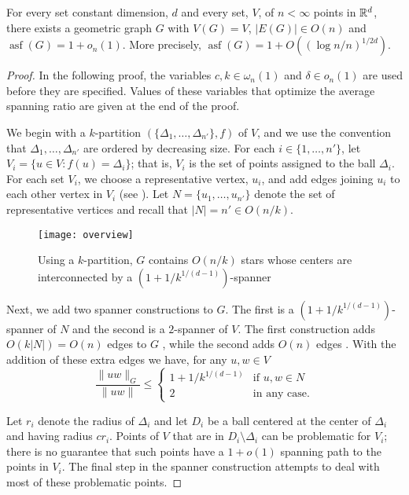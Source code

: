\documentclass{patmorin}
\DeclareMathOperator{\asf}{asf}
\begin{document}
\begin{thm}
  For every set constant dimension, $d$ and every set, $V$, of
  $n<\infty$ points in $\mathbb{R}^d$, there exists a geometric graph $G$ with
  $V(G)=V$, $|E(G)|\in O(n)$ and $\asf(G)=1+o_n(1)$.  More precisely,
  $\asf(G)=1+O((\log n/n)^{1/2d})$.
\end{thm}

\begin{proof}
  In the following proof, the variables $c,k\in\omega_n(1)$ and $\delta\in
  o_n(1)$ are used before they are specified.  Values of these variables
  that optimize the average spanning ratio are given at the end of
  the proof.

  We begin with a $k$-partition $(\{\Delta_1,\ldots,\Delta_{n'}\},f)$
  of $V$, and we use the convention that $\Delta_1,\ldots,\Delta_{n'}$
  are ordered by decreasing size.  For each $i\in \{1,\ldots,n'\}$,
  let $V_i=\{u\in V : f(u)=\Delta_i\}$; that is, $V_i$ is the set of
  points assigned to the ball $\Delta_i$.  For each set $V_i$, we choose a
  representative vertex, $u_i$, and add edges joining $u_i$ to each other
  vertex in $V_i$ (see ). Let $N=\{u_1,\ldots,u_{n'}\}$
  denote the set of representative vertices and recall that $|N|=n'\in
  O(n/k)$.

  \begin{figure}
    \begin{center} 
      \texttt{[image: overview]}
    \end{center} 
    \caption{Using a $k$-partition, $G$ contains $O(n/k)$ stars whose
      centers are interconnected by a $(1+1/k^{1/(d-1)})$-spanner}
  \end{figure}

  Next, we add two spanner constructions to $G$.  The first is a
  $(1+1/k^{1/(d-1)})$-spanner of $N$ and the second is a $2$-spanner
  of $V$.  The first construction adds $O(k|N|)=O(n)$ edges to $G$
  \cite[Section~5.5]{narasimhan.smid:geometric}, while the second adds
  $O(n)$ edges \cite{x,ys,ss}.  With the addition of these extra edges
  we have, for any $u,w\in V$
  \[
     \frac{\|uw\|_G}{\|uw\|} \le \begin{cases}
           1+1/k^{1/(d-1)} & \text{if $u,w\in N$} \\
           2 & \text{in any case.}
         \end{cases}
  \]
  
  Let $r_i$ denote the radius of $\Delta_i$ and let $D_i$ be a ball
  centered at the center of $\Delta_i$ and having radius $cr_i$.
  Points of $V$ that are in $D_i\setminus \Delta_i$ can be problematic
  for $V_i$; there is no guarantee that such points have a $1+o(1)$
  spanning path to the points in $V_i$.  The final step in the spanner
  construction attempts to deal with most of these problematic points.


\end{proof}
\end{document}
